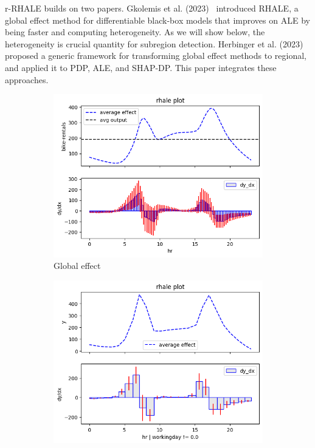 \documentclass[
twocolumn,
]{ceurart}
\begin{document}
r-RHALE builds on two papers. Gkolemis et al. (2023)~\citep{gkolemis2023rhale} introduced RHALE, a global effect method for differentiable black-box models that improves on ALE by being faster and computing heterogeneity. As we will show below, the heterogeneity is crucial quantity for subregion detection. Herbinger et al. (2023)~\citep{herbinger2023decomposing} proposed a generic framework for transforming global effect methods to regional, and applied it to PDP\cite{friedman_predictive_2008}, ALE\cite{apley_visualizing_2020}, and SHAP-DP\cite{lundberg2017unified}. This paper integrates these approaches.

\begin{figure}
  \centering
  \begin{subfigure}[t]{0.32\textwidth}
  \centering
  \includegraphics[width=\linewidth]{figures/running_example/01_bike_sharing_dataset_23_1.png}
  \caption{Global effect}
  \label{subfig:global}
  \end{subfigure}
  \begin{subfigure}[t]{0.32\textwidth}
  \centering
  \includegraphics[width=\linewidth]{figures/running_example/01_bike_sharing_dataset_29_1.png}

\end{subfigure}
\end{figure}
\end{document}
